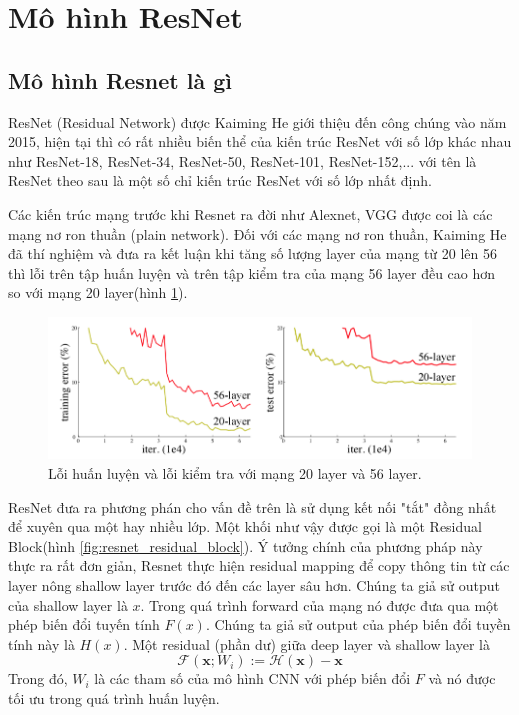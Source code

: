 \section{Mô hình ResNet}
\subsection{Mô hình Resnet là gì}
ResNet (Residual Network) được Kaiming He\cite{resnet} giới thiệu đến công chúng vào năm 2015, hiện tại thì có rất nhiều biến thể của kiến trúc ResNet với số lớp khác nhau như ResNet-18, ResNet-34, ResNet-50, ResNet-101, ResNet-152,... với tên là ResNet theo sau là một số chỉ kiến trúc ResNet với số lớp nhất định.

Các kiến trúc mạng trước khi Resnet ra đời như Alexnet, VGG được coi là các mạng nơ ron thuần (plain network). Đối với các mạng nơ ron thuần, Kaiming He\cite{resnet} đã thí nghiệm và đưa ra kết luận khi tăng số lượng layer của mạng từ 20 lên 56 thì lỗi trên tập huấn luyện và trên tập kiểm tra của mạng 56 layer đều cao hơn so với mạng 20 layer(hình \ref{fig:resnet_vanishing_gradient}). 
\begin{figure}[H]
	\centering
	\includegraphics[width=1\linewidth]{images/resnet_vanishing_gradient}
	\caption{Lỗi huấn luyện và lỗi kiểm tra với mạng 20 layer và 56 layer.}
	\label{fig:resnet_vanishing_gradient}
\end{figure} 
ResNet đưa ra phương phán cho vấn đề trên là sử dụng kết nối "tắt" đồng nhất để xuyên qua một hay nhiều lớp. Một khối như vậy được gọi là một Residual Block(hình \ref{fig:resnet_residual_block}). Ý tưởng chính của phương pháp này thực ra rất đơn giản, Resnet thực hiện residual mapping để copy thông tin từ các layer nông shallow layer trước đó đến các layer sâu hơn. Chúng ta giả sử output của shallow layer là $x$. Trong quá trình forward của mạng nó được đưa qua một phép biến đổi tuyến tính $F(x)$. Chúng ta giả sử output của phép biến đổi tuyền tính này là $H(x)$. Một residual (phần dư) giữa deep layer và shallow layer là
$$\mathcal{F}(\mathbf{x}; W_i) := \mathcal{H}(\mathbf{x}) - \mathbf{x}$$
Trong đó, $W_i$ là các tham số của mô hình CNN với phép biến đổi $F$ và nó được tối ưu trong quá trình huấn luyện.

